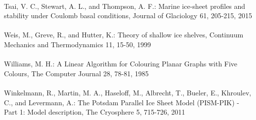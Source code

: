 \documentclass{article}
\begin{document}
\\
Tsai, V. C., Stewart, A. L., and Thompson, A. F.: Marine ice-sheet profiles and stability under Coulomb basal conditions, Journal of Glaciology 61, 205-215, 2015\\
\\
Weis, M., Greve, R., and Hutter, K.: Theory of shallow ice shelves, Continuum Mechanics and Thermodynamics 11, 15-50, 1999\\
\\
Williams, M. H.: A Linear Algorithm for Colouring Planar Graphs with Five Colours, The Computer Journal 28, 78-81, 1985\\
\\
Winkelmann, R., Martin, M. A., Haseloff, M., Albrecht, T., Bueler, E., Khroulev, C., and Levermann, A.: The Potsdam Parallel Ice Sheet Model (PISM-PIK) - Part 1: Model description, The Cryosphere 5, 715-726, 2011\\
\\
\end{document}
